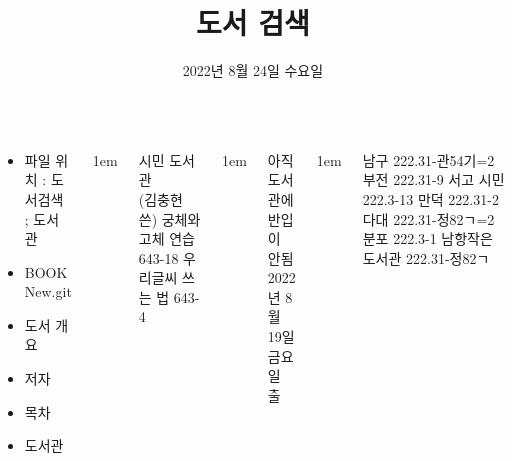 \documentclass[	17pt, 
							a1paper, 
							portrait, %
							margin=0mm, %
							innermargin=10mm,  		%
							blockverticalspace=4mm, %
							colspace=5mm, 
							subcolspace=0mm
							]{tikzposter}
\title{도서 검색}
\author{ 2022년 8월 24일 수요일  }
\begin{document}
	\maketitle

	\begin{columns}


			{
				\begin{LARGE}
			\begin{itemize}
				\item 파일 위치 : 도서검색 ; 도서관
				\item BOOK New.git
				\item 도서 개요
				\item 저자
				\item 목차
				\item 도서관
			\end{itemize}
				\end{LARGE}
			}


			{
					\setlength{\leftmargini}{7em}
					\setlength{\labelsep} {1em}
				\begin{LARGE}
				시민 도서관	\\
				(김충현 쓴) 궁체와 고체 연습  643-18
				우리글씨 쓰는 법   643-4
				\end{LARGE}
			}


			{
					\setlength{\leftmargini}{7em}
					\setlength{\labelsep} {1em}
				\begin{LARGE}
				아직 도서관에 반입이 안됨 \\
				2022년 8월 19일 금요일 출
				\end{LARGE}
			}


			{
					\setlength{\leftmargini}{7em}
					\setlength{\labelsep} {1em}
				\begin{LARGE}

남구    222.31-관54기=2 
부전   222.31-9 서고 
시민  222.3-13 
만덕  222.31-2  
다대  222.31-정82ㄱ=2 
분포  222.3-1   
남항작은도서관  222.31-정82ㄱ  
				\end{LARGE}
			}





\end{columns}
\end{document}
